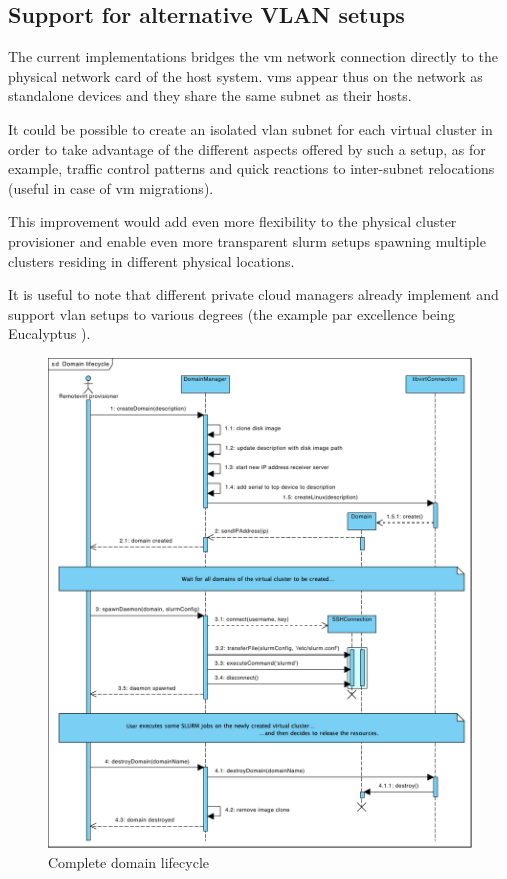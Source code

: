 \subsection{Support for alternative VLAN setups}

The current implementations bridges the \gls{vm} network connection directly to the physical network card of the host system. \glspl{vm} appear thus on the network as standalone devices and they share the same subnet as their hosts.

It could be possible to create an isolated \gls{vlan} subnet for each virtual cluster in order to take advantage of the different aspects offered by such a setup, as for example, traffic control patterns and quick reactions to inter-subnet relocations (useful in case of \gls{vm} migrations).

This improvement would add even more flexibility to the physical cluster provisioner and enable even more transparent \gls{slurm} setups spawning multiple clusters residing in different physical locations.

It is useful to note that different private cloud managers already implement and support \gls{vlan} setups to various degrees (the example par excellence being Eucalyptus \cite{eucalyptus-manual} \cite{eucalyptus-ns-www}).


\begin{figure}[p]
	\centering
	\includegraphics[width=1\textwidth]{figures/domain-lifecycle}
	\caption{Complete domain lifecycle}
	\label{fig:domain-lifecycle}
\end{figure}